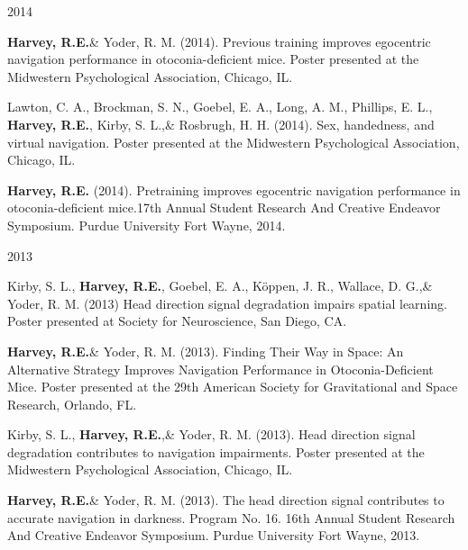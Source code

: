 \begin{cventries}
\cventry
    {} %
    {} %
    {} %
    {2014} %
    {
      \begin{cvitems} %
      \setlength\itemsep{0.4em}
        \item {\textbf{Harvey, R.E.}\& Yoder, R. M. (2014). Previous training improves egocentric navigation performance in otoconia-deficient mice. Poster presented at the Midwestern Psychological Association, Chicago, IL.}
        \item {Lawton, C. A., Brockman, S. N., Goebel, E. A., Long, A. M., Phillips, E. L., \textbf{Harvey, R.E.}, Kirby, S. L.,\& Rosbrugh, H. H. (2014). Sex, handedness, and virtual navigation. Poster presented at the Midwestern Psychological Association, Chicago, IL.}
        \item {\textbf{Harvey, R.E.} (2014). Pretraining improves egocentric navigation performance in otoconia-deficient mice.17th Annual Student Research And Creative Endeavor Symposium. Purdue University Fort Wayne, 2014.}
      \end{cvitems}
    }
\end{cventries}

\begin{cventries}
\cventry
    {} %
    {} %
    {} %
    {2013} %
    {
      \begin{cvitems} %
      \setlength\itemsep{0.4em}
        \item {Kirby, S. L., \textbf{Harvey, R.E.}, Goebel, E. A., Köppen, J. R., Wallace, D. G.,\& Yoder, R. M. (2013) Head direction signal degradation impairs spatial learning. Poster presented at Society for Neuroscience, San Diego, CA.}
        \item {\textbf{Harvey, R.E.}\& Yoder, R. M. (2013). Finding Their Way in Space: An Alternative Strategy Improves Navigation Performance in Otoconia-Deficient Mice. Poster presented at the 29th American Society for Gravitational and Space Research, Orlando, FL.}
        \item {Kirby, S. L., \textbf{Harvey, R.E.},\& Yoder, R. M. (2013). Head direction signal degradation contributes to navigation impairments. Poster presented at the Midwestern Psychological Association, Chicago, IL.}
        \item {\textbf{Harvey, R.E.}\& Yoder, R. M. (2013). The head direction signal contributes to accurate navigation in darkness. Program No. 16. 16th Annual Student Research And Creative Endeavor Symposium. Purdue University Fort Wayne, 2013.}
      \end{cvitems}
    }
\end{cventries}
